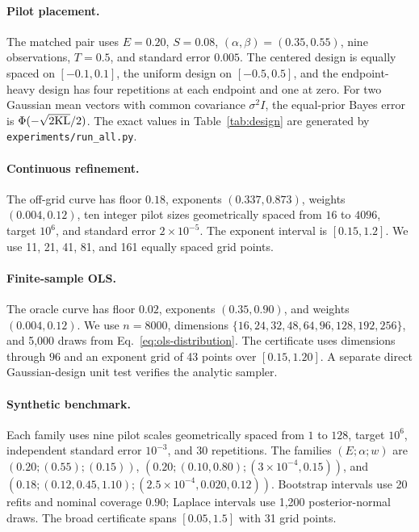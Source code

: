 \paragraph{Pilot placement.}
The matched pair uses $E=0.20$, $S=0.08$, $(\alpha,\beta)=(0.35,0.55)$, nine observations, $T=0.5$, and standard error $0.005$. The centered design is equally spaced on $[-0.1,0.1]$, the uniform design on $[-0.5,0.5]$, and the endpoint-heavy design has four repetitions at each endpoint and one at zero. For two Gaussian mean vectors with common covariance $\sigma^2I$, the equal-prior Bayes error is
$\Phi(-\sqrt{2\mathrm{KL}}/2)$. The exact values in Table~\ref{tab:design} are generated by \texttt{experiments/run\_all.py}.

\paragraph{Continuous refinement.}
The off-grid curve has floor $0.18$, exponents $(0.337,0.873)$, weights $(0.004,0.12)$, ten integer pilot sizes geometrically spaced from $16$ to $4096$, target $10^6$, and standard error $2\times10^{-5}$. The exponent interval is $[0.15,1.2]$. We use 11, 21, 41, 81, and 161 equally spaced grid points.

\paragraph{Finite-sample OLS.}
The oracle curve has floor $0.02$, exponents $(0.35,0.90)$, and weights $(0.004,0.12)$. We use $n=8000$, dimensions
$\{16,24,32,48,64,96,128,192,256\}$, and 5,000 draws from Eq.~\eqref{eq:ols-distribution}. The certificate uses dimensions through $96$ and an exponent grid of 43 points over $[0.15,1.20]$. A separate direct Gaussian-design unit test verifies the analytic sampler.

\paragraph{Synthetic benchmark.}
Each family uses nine pilot scales geometrically spaced from $1$ to $128$, target $10^6$, independent standard error $10^{-3}$, and 30 repetitions. The families $(E;\alpha;w)$ are
$(0.20;(0.55);(0.15))$,
$(0.20;(0.10,0.80);(3\times10^{-4},0.15))$, and
$(0.18;(0.12,0.45,1.10);(2.5\times10^{-4},0.020,0.12))$.
Bootstrap intervals use 20 refits and nominal coverage $0.90$; Laplace intervals use 1,200 posterior-normal draws. The broad certificate spans $[0.05,1.5]$ with 31 grid points.

